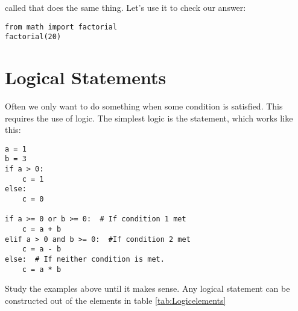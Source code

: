 called  that does the same thing.  Let's use it to
check our answer:

\begin{Verbatim}
from math import factorial
factorial(20)
\end{Verbatim}

\section{Logical Statements}
 Often we only want to do something when some condition is satisfied.
This requires the use of logic.  The simplest logic is the 
statement, which works like this:
\begin{Verbatim}
a = 1
b = 3
if a > 0:
    c = 1
else:
    c = 0

if a >= 0 or b >= 0:  # If condition 1 met
    c = a + b
elif a > 0 and b >= 0:  #If condition 2 met
    c = a - b
else:  # If neither condition is met.
    c = a * b
\end{Verbatim}
Study the examples above until it makes sense.  Any logical statement
can be constructed out of the elements in table
\ref{tab:Logicelements}

